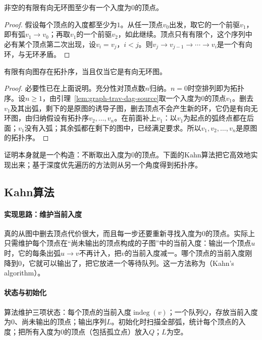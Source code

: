 \begin{lemma}[有向无环图有源点]
\label{lem:graph-trav-dag-source}
非空的有限有向无环图至少有一个入度为$0$的顶点。
\end{lemma}

\begin{proof}
假设每个顶点的入度都至少为$1$。从任一顶点$v_0$出发，取它的一个前驱$v_1$，即有弧$v_1\to v_0$；再取$v_1$的一个前驱$v_2$，如此继续。顶点只有有限个，这个序列中必有某个顶点第二次出现，设$v_i=v_j$，$i<j$。则$v_j\to v_{j-1}\to\cdots\to v_i$是一个有向环，与无环矛盾。
\end{proof}

\begin{theorem}[拓扑序的存在性]
\label{thm:graph-trav-topological-existence}
有限有向图存在拓扑序，当且仅当它是有向无环图。
\end{theorem}

\begin{proof}
必要性已在上面说明。充分性对顶点数$n$归纳。$n=0$时空排列即为拓扑序。设$n\geq1$，由引理~\ref{lem:graph-trav-dag-source}取一个入度为$0$的顶点$v_1$。删去$v_1$及其出弧，剩下的是原图的诱导子图，删去顶点不会产生新的环，它仍是有向无环图，由归纳假设有拓扑序$v_2,\ldots,v_n$。在前面补上$v_1$：以$v_1$为起点的弧终点都在后面；$v_1$没有入弧；其余弧都在剩下的图中，已经满足要求。所以$v_1,v_2,\ldots,v_n$是原图的拓扑序。
\end{proof}

证明本身就是一个构造：不断取出入度为$0$的顶点。下面的Kahn算法把它高效地实现出来；基于深度优先遍历的方法则从另一个角度得到拓扑序。

\subsection{Kahn算法}
\label{sec:graph-trav-kahn}

\paragraph{实现思路：维护当前入度}
真的从图中删去顶点代价很大，而且每一步还要重新寻找入度为$0$的顶点。实际上只需维护每个顶点在“尚未输出的顶点构成的子图”中的当前入度：输出一个顶点$u$时，它的每条出弧$u\to v$不再计入，把$v$的当前入度减一。哪个顶点的当前入度刚降到$0$，它就可以输出了，把它放进一个等待队列。这一方法称为（Kahn's algorithm）。

\paragraph{状态与初始化}
算法维护三项状态：每个顶点的当前入度$\operatorname{indeg}(v)$；一个队列$Q$，存放当前入度为$0$、尚未输出的顶点；输出序列$L$。初始化时扫描全部弧，统计每个顶点的入度；把所有入度为$0$的顶点（包括孤立点）放入$Q$；$L$为空。


